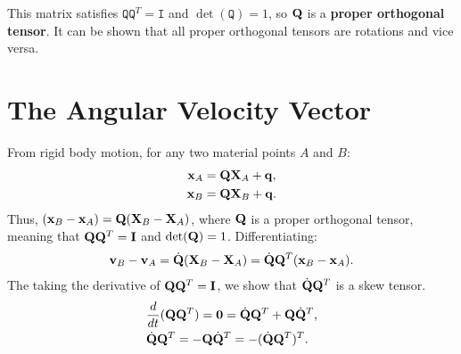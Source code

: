 \documentclass[
  letterpaper,
  DIV=11,
  numbers=noendperiod]{scrreprt}
\begin{document}
\begin{tcolorbox}[enhanced jigsaw, arc=.35mm, bottomrule=.15mm, bottomtitle=1mm, breakable, colback=white, colbacktitle=quarto-callout-important-color!10!white, colframe=quarto-callout-important-color-frame, coltitle=black, left=2mm, leftrule=.75mm, opacityback=0, opacitybacktitle=0.6, rightrule=.15mm, title=\textcolor{quarto-callout-important-color}{\faExclamation}\hspace{0.5em}{Note!}, titlerule=0mm, toprule=.15mm, toptitle=1mm]

This matrix satisfies \(\mathtt{Q}\mathtt{Q}^T = \mathtt{I}\) and
\(\det(\mathtt{Q})=1\), so \({\bf Q}\) is a \textbf{proper orthogonal
tensor}. It can be shown that all proper orthogonal tensors are
rotations and vice versa.

\end{tcolorbox}

\section{The Angular Velocity Vector}\label{the-angular-velocity-vector}

From rigid body motion, for any two material points \(A\) and \(B\):
\begin{align}
    {\bf x}_A &= {\bf Q}{\bf X}_A+{\bf q},\\
    {\bf x}_B &= {\bf Q}{\bf X}_B+{\bf q}.
\end{align} Thus,
\(({\bf x}_B-{\bf x}_A) = {\bf Q}({\bf X}_B-{\bf X}_A)\), where
\({\bf Q}\) is a proper orthogonal tensor, meaning that
\({\bf Q}{\bf Q}^T = {\bf I}\) and \(\det({\bf Q}) = 1\).
Differentiating: \begin{align}
    {\bf v}_B-{\bf v}_A =\dot{\bf Q}({\bf X}_B-{\bf X}_A) = \dot{\bf Q}{\bf Q}^T({\bf x}_B-{\bf x}_A).
\end{align} The taking the derivative of \({\bf Q}{\bf Q}^T={\bf I}\),
we show that \(\dot{\bf Q}{\bf Q}^T\) is a skew tensor. \begin{align}
    & \frac{d}{dt}({\bf Q}{\bf Q}^T) = {\bf 0} = \dot{\bf Q}{\bf Q}^T+{\bf Q}\dot{\bf Q}^T,\\
    & \dot{\bf Q}{\bf Q}^T = -{\bf Q}\dot{\bf Q}^T = -(\dot{\bf Q}{\bf Q}^T)^T.
\end{align}
\end{document}
